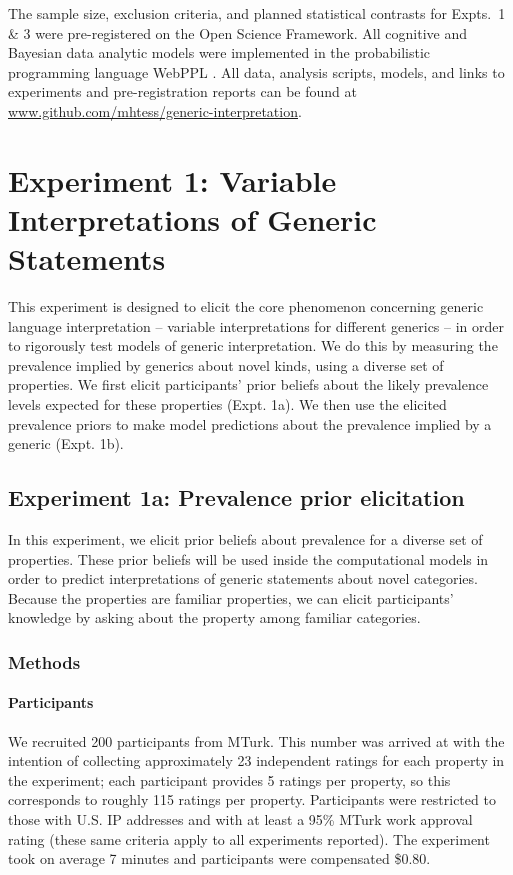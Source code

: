 \documentclass[floatsintext,man]{apa6}
\let\oldparagraph\paragraph
\renewcommand{\paragraph}[1]{\oldparagraph{#1}\mbox{}}
\begin{document}
The sample size, exclusion criteria, and planned statistical contrasts for Expts.~1 \& 3 were pre-registered on the Open Science Framework.
All cognitive and Bayesian data analytic models were implemented in the probabilistic programming language WebPPL \cite{dippl}. 
All data, analysis scripts, models, and links to experiments and pre-registration reports can be found at \url{www.github.com/mhtess/generic-interpretation}.

\hypertarget{experiment-1}{%
\section{Experiment 1: Variable Interpretations of Generic Statements}\label{experiment-1}}

This experiment is designed to elicit the core phenomenon concerning generic language interpretation -- variable interpretations for different generics -- in order to rigorously test models of generic interpretation.
We do this by measuring the prevalence implied by generics about novel kinds, using a diverse set of properties.
We first elicit participants' prior beliefs about the likely prevalence levels expected for these properties (Expt. 1a).
We then use the elicited prevalence priors to make model predictions about the prevalence implied by a generic (Expt. 1b).

\hypertarget{experiment-1a-prevalence-prior-elicitation}{%
\subsection{Experiment 1a: Prevalence prior elicitation}\label{experiment-1a-prevalence-prior-elicitation}}

In this experiment, we elicit prior beliefs about prevalence for a diverse set of properties.
These prior beliefs will be used inside the computational models in order to predict interpretations of generic statements about novel categories. %
Because the properties are familiar properties, we can elicit participants' knowledge by asking about the property among familiar  categories.

\hypertarget{methods}{%
\subsubsection{Methods}\label{methods}}

\hypertarget{participants-1}{%
\paragraph{Participants}\label{participants-1}}
We recruited 200 participants from MTurk.
This number was arrived at with the intention of collecting approximately 23 independent ratings for each property in the experiment; each participant provides 5 ratings per property, so this corresponds to roughly 115 ratings per property. 
Participants were restricted to those with U.S. IP addresses and with at least a 95\% MTurk work approval rating (these same criteria apply to all experiments reported).
The experiment took on average 7 minutes and participants were compensated \$0.80.
\end{document}
